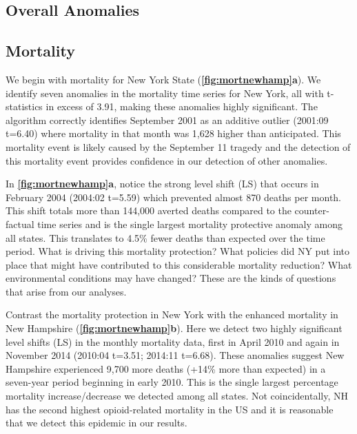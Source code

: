\documentclass[12pt]{article}
\begin{document}
\hypertarget{overall-anomalies}{%
\subsection{Overall Anomalies}\label{overall-anomalies}}

\hypertarget{mortality}{%
\subsection{Mortality}\label{mortality}}

We begin with mortality for New York State
(\textbf{\autoref{fig:mortnewhamp}a}). We identify seven anomalies in
the mortality time series for New York, all with t-statistics in excess
of 3.91, making these anomalies highly significant. The algorithm
correctly identifies September 2001 as an additive outlier (2001:09
t=6.40) where mortality in that month was 1,628 higher than anticipated.
This mortality event is likely caused by the September 11 tragedy and
the detection of this mortality event provides confidence in our
detection of other anomalies.

In \textbf{\autoref{fig:mortnewhamp}a}, notice the strong level shift
(LS) that occurs in February 2004 (2004:02 t=5.59) which prevented
almost 870 deaths per month. This shift totals more than 144,000 averted
deaths compared to the counter-factual time series and is the single
largest mortality protective anomaly among all states. This translates
to 4.5\% fewer deaths than expected over the time period. What is
driving this mortality protection? What policies did NY put into place
that might have contributed to this considerable mortality reduction?
What environmental conditions may have changed? These are the kinds of
questions that arise from our analyses.

Contrast the mortality protection in New York with the enhanced
mortality in New Hampshire (\textbf{\autoref{fig:mortnewhamp}b}). Here
we detect two highly significant level shifts (LS) in the monthly
mortality data, first in April 2010 and again in November 2014 (2010:04
t=3.51; 2014:11 t=6.68). These anomalies suggest New Hampshire
experienced 9,700 more deaths (+14\% more than expected) in a seven-year
period beginning in early 2010. This is the single largest percentage
mortality increase/decrease we detected among all states. Not
coincidentally, NH has the second highest opioid-related mortality in
the US \citep{beetham2019access} and it is reasonable that we detect
this epidemic in our results.
\end{document}
